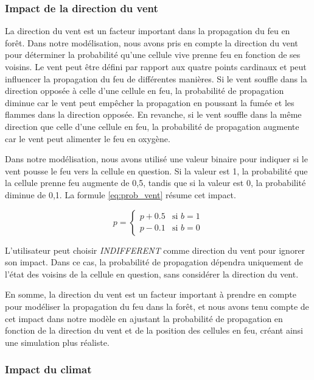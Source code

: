 \subsubsection{Impact de la direction du vent}

La direction du vent est un facteur important dans la propagation du feu en forêt. Dans notre modélisation, nous avons pris en compte la direction du vent pour déterminer la probabilité qu'une cellule vive prenne feu en fonction de ses voisins. Le vent peut être défini par rapport aux quatre points cardinaux et peut influencer la propagation du feu de différentes manières. Si le vent souffle dans la direction opposée à celle d'une cellule en feu, la probabilité de propagation diminue car le vent peut empêcher la propagation en poussant la fumée et les flammes dans la direction opposée. En revanche, si le vent souffle dans la même direction que celle d'une cellule en feu, la probabilité de propagation augmente car le vent peut alimenter le feu en oxygène. 

Dans notre modélisation, nous avons utilisé une valeur binaire pour indiquer si le vent pousse le feu vers la cellule en question. Si la valeur est 1, la probabilité que la cellule prenne feu augmente de 0,5, tandis que si la valeur est 0, la probabilité diminue de 0,1. La formule \ref{eq:prob_vent} résume cet impact.

\begin{equation}
    p = \begin{cases}
    p + 0.5 & \text{si } b = 1 \\
    p - 0.1 & \text{si } b = 0
    \end{cases}
    \label{eq:prob_vent}
\end{equation}

L'utilisateur peut choisir \textit{INDIFFERENT} comme direction du vent pour ignorer son impact. Dans ce cas, la probabilité de propagation dépendra uniquement de l'état des voisins de la cellule en question, sans considérer la direction du vent. 

En somme, la direction du vent est un facteur important à prendre en compte pour modéliser la propagation du feu dans la forêt, et nous avons tenu compte de cet impact dans notre modèle en ajustant la probabilité de propagation en fonction de la direction du vent et de la position des cellules en feu, créant ainsi une simulation plus réaliste.

\subsubsection{ Impact du climat}

